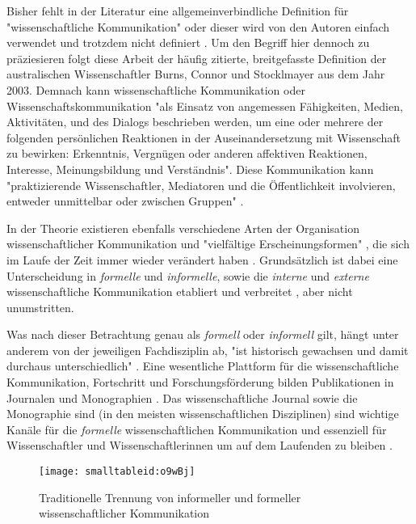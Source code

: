 Bisher fehlt in der Literatur eine allgemeinverbindliche Definition für "wissenschaftliche Kommunikation" oder dieser wird von den Autoren einfach verwendet und trotzdem nicht definiert \cite[:2]{seidenfaden_2005_kommunikation}. Um den Begriff hier dennoch zu präziesieren folgt diese Arbeit der häufig zitierte, breitgefasste Definition der australischen Wissenschaftler Burns, Connor und Stocklmayer aus dem Jahr 2003. Demnach kann wissenschaftliche Kommunikation oder Wissenschaftskommunikation "als Einsatz von angemessen Fähigkeiten, Medien, Aktivitäten, und des Dialogs beschrieben werden, um eine oder mehrere der folgenden persönlichen Reaktionen in der Auseinandersetzung mit Wissenschaft zu bewirken: Erkenntnis, Vergnügen oder anderen affektiven Reaktionen, Interesse, Meinungsbildung und Verständnis". Diese Kommunikation kann "praktizierende Wissenschaftler, Mediatoren und die Öffentlichkeit involvieren, entweder unmittelbar oder zwischen Gruppen" \cite[:191]{Burns_2003}.

In der Theorie existieren ebenfalls verschiedene Arten der Organisation wissenschaftlicher Kommunikation und "vielfältige Erscheinungsformen" \cite{graefen2007_wissenschaftliche_artikel}, die sich im Laufe der Zeit immer wieder verändert haben \cite{Konneker_2013} \cite{hagner_2015_sache_buches}. Grundsätzlich ist dabei eine Unterscheidung in \textit{formelle} und \textit{informelle}, sowie die \textit{interne} und \textit{externe} wissenschaftliche Kommunikation etabliert und verbreitet \cite{seidenfaden_2005_kommunikation}, aber nicht unumstritten.

Was nach dieser Betrachtung genau als \textit{formell} oder \textit{informell} gilt, hängt unter anderem von der jeweiligen Fachdisziplin ab, "ist historisch gewachsen und damit durchaus unterschiedlich" \cite{Hanekop_2014}. Eine wesentliche Plattform für die wissenschaftliche Kommunikation, Fortschritt und Forschungsförderung bilden Publikationen in Journalen und Monographien \cite{cope2014future} \cite{fox_1983_publication}. Das wissenschaftliche Journal sowie die Monographie sind (in den meisten wissenschaftlichen Disziplinen) sind wichtige Kanäle für die \textit{formelle} wissenschaftlichen Kommunikation und essenziell für Wissenschaftler und Wissenschaftlerinnen um auf dem Laufenden zu bleiben \cite{cope2014future}.

\begin{figure}[h!]
\texttt{[image: smalltableid:o9wBj]}
\caption{Traditionelle Trennung von informeller und formeller wissenschaftlicher Kommunikation}
\end{figure}

